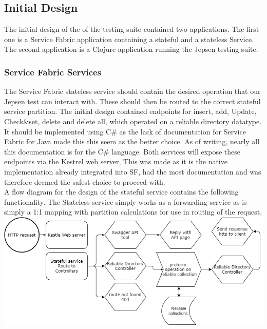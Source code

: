 \documentclass[a4paper,10pt,titlepage]{report}
\begin{document}
    \subsection{Initial Design}

    The initial design of the of the testing suite contained two applications. The first one is a Service Fabric application containing a stateful and a stateless Service. The second application is a Clojure application running the Jepsen testing suite.

    \subsubsection{Service Fabric Services}

    The Service Fabric stateless service should contain the desired operation that our Jepsen test can interact with. These should then be routed to the correct stateful service partition. The initial design contained endpoints for insert, add, Update, Check\&set, delete and delete all, which operated on a reliable directory datatype. It should be implemented using C\# as the lack of documentation for Service Fabric for Java made this this seem as the better choice. As of writing, nearly all this documentation is for the C\# language. Both services will expose these endpoints via the Kestrel web server, This was made as it is the native implementation already integrated into SF, had the most documentation and was therefore deemed the safest choice to proceed with.\\
    \vspace{5mm}
    A flow diagram for the design of the stateful service contains the following functionality. The Stateless service simply works as a forwarding service as is simply a 1:1 mapping with partition calculations for use in routing of the request. \\
    \vspace{5mm}
    \includegraphics[scale=0.5]{images/Design_Stateful_service_1.0.drawio.png}
\end{document}
